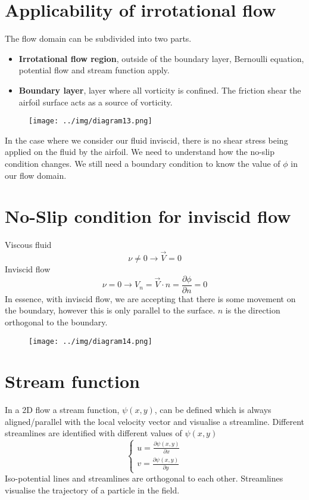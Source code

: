 \documentclass[class=report, crop=false, 12pt,a4paper]{standalone}
\begin{document}
\section{Applicability of irrotational flow}
The flow domain can be subdivided into two parts.
\begin{itemize}
  \item \textbf{Irrotational flow region}, outside of the boundary layer, Bernoulli equation, potential flow and stream function apply.
  \item \textbf{Boundary layer}, layer where all vorticity is confined. The friction shear the airfoil surface acts as a source of vorticity.
\end{itemize}
\begin{figure}[H]
  \centering
  \texttt{[image: ../img/diagram13.png]}
\end{figure}
In the case where we consider our fluid inviscid, there is no shear stress being applied on the fluid by the airfoil. We need to understand how the no-slip condition changes. We still need a boundary condition to know the value of $\phi$ in our flow domain.
\section{No-Slip condition for inviscid flow}
Viscous fluid
\begin{equation}
  \nu \neq 0 \rightarrow \vec{V} = 0
\end{equation}
Inviscid flow
\begin{equation}
  \nu = 0 \rightarrow V_n = \vec{V} \cdot \hat{n} = \frac{\partial \phi}{\partial n} = 0
\end{equation}
In essence, with inviscid flow, we are accepting that there is some movement on the boundary, however this is only parallel to the surface. $n$ is the direction orthogonal to the boundary.
\begin{figure}[H]
  \centering
  \texttt{[image: ../img/diagram14.png]}
\end{figure}
\section{Stream function}
In a 2D flow a stream function, $\psi(x, y)$, can be defined which is always aligned/parallel with the local velocity vector and visualise a streamline. Different streamlines are identified with different values of $\psi (x,y)$
\begin{equation}
  \begin{cases}
    u = \frac{\partial \psi(x,y)}{\partial x}\\
    v = \frac{\partial \psi(x,y)}{\partial y}
  \end{cases}
\end{equation}
Iso-potential lines and streamlines are orthogonal to each other. Streamlines visualise the trajectory of a particle in the field.
\end{document}
